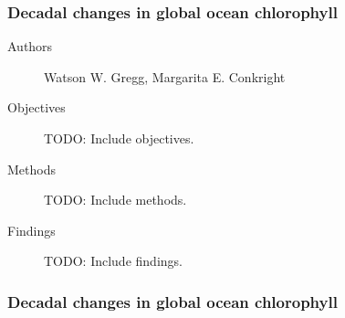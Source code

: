 \begin{frame}\frametitle{Decadal changes in global ocean chlorophyll} 
\begin{description}
    \item[Authors] Watson W. Gregg, Margarita E. Conkright
    \item[Objectives] TODO: Include objectives.
    \item[Methods] TODO: Include methods.
    \item[Findings] TODO: Include findings.
\end{description}

\end{frame}

\begin{frame}\frametitle{Decadal changes in global ocean chlorophyll} 

\end{frame}

